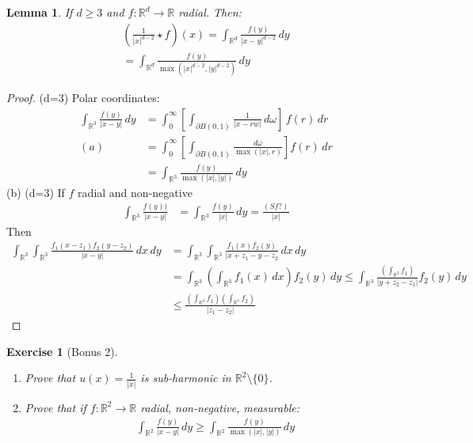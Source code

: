 \documentclass{report}
\theoremstyle{tommy}
\newtheorem{lem}[defn]{Lemma}
\newtheorem{ex}[defn]{Exercise}
\begin{document}
  
  \begin{lem}
    If \(d \ge 3\) and \(f: \mathbb{R}^d \to \mathbb{R}\) radial. Then:
    \begin{align*}
      \left(\frac{1}{|x|^{d-2}} \star f \right)(x) 
      = \int_{\mathbb{R}^d} \frac{f(y)}{|x-y|^{d-2}} \, dy \\
      = \int_{\mathbb{R}^d} \frac{f(y)}{\max(|x|^{d-2}, |y|^{d-2})}\, dy
    \end{align*}
  \end{lem}
  \begin{proof}
    (d=3) Polar coordinates:
    \begin{align*}
      \int_{\mathbb{R}^3} \frac{f(y)}{|x-y|}\, dy 
      &= \int_0^{\infty} \left[\int_{\partial B(0,1)} \frac{1}{|x-rw|} \, d\omega \right] \, f(r) \, dr \\
      (a) \quad &= \int_0^\infty \left[\int_{\partial B(0,1)} \frac{d \omega}{\max(|x|, r)}\right] f(r) \, dr \\
      &= \int_{\mathbb{R}^3} \frac{f(y)}{\max(|x|, |y|)} \, dy
    \end{align*}
    (b) (d=3) If \(f\) radial and non-negative
    \begin{align*}
      \int_{\mathbb{R}^3} \frac{f(y))}{|x-y|} &= \int_{\mathbb{R}^3} \frac{f(y)}{|x|} \, dy = \frac{(Sf?)}{|x|}
    \end{align*}
    Then
    \begin{align*}
      \int_{\mathbb{R}^3}\int_{\mathbb{R}^3} \frac{f_1(x-z_1)f_2(y-z_2)}{|x-y|} \, dx \, dy &= \int_{\mathbb{R}^3}\int_{\mathbb{R}^3} \frac{f_1(x) f_2(y)}{|x+ z_1 - y - z_2} \, dx \, dy \\
      &= \int_{\mathbb{R}^3} \left(\int_{\mathbb{R}^3} f_1(x) \, dx \right) f_2(y) \, dy \le \int_{\mathbb{R}^3} \frac{\left(\int_{\mathbb{R}^3} f_1\right)}{|y + z_2 - z_1|} f_2(y) \, dy \\
      &\le \frac{(\int_{\mathbb{R}^3} f_1)(\int_{\mathbb{R}^3} f_2)}{|z_1 - z_2|}
    \end{align*}
  \end{proof}

  
  \begin{ex}[Bonus 2]
    \begin{enumerate}[label=\alph*)]
      \item Prove that \(u(x) = \frac{1}{|x|}\) is sub-harmonic in \(\mathbb{R}^2 \setminus \{0\}\). 
      \item Prove that if \(f: \mathbb{R}^2 \to \mathbb{R}\) radial, non-negative, measurable:
      \begin{align*}
        \int_{\mathbb{R}^2} \frac{f(y)}{|x-y|} \, dy \ge \int_{\mathbb{R}^2} \frac{f(y)}{\max(|x|, |y|)} \, dy
      \end{align*}
    \end{enumerate}
  \end{ex}
\end{document}

